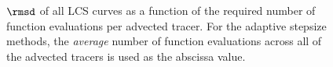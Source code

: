 \begin{figure}[htpb]
    \centering
    
    \caption[$\rmsd$ of all LCS curves as a function of the required number
    of function evaluations per advected tracer]
                {$\rmsd$ of all LCS curves as a function of the required number
                of function evaluations per advected tracer. For the adaptive stepsize methods,
                the \emph{average} number of function evaluations across all of
                the advected tracers is used as the abscissa value.}
    \label{fig:lcs_err_both}
\end{figure}
